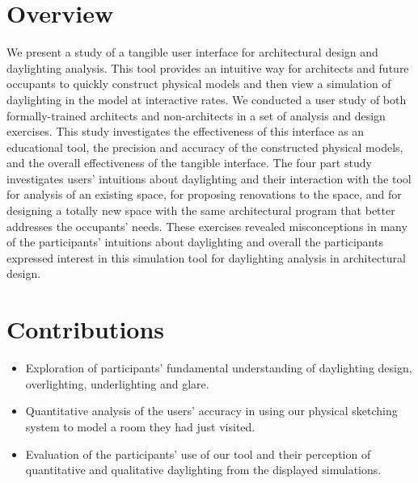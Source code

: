 \documentclass[landscape,20pt]{sciposter}
\begin{document}
\begin{minipage}[t]{10.5in}
\section*{Overview}
We present a study of a tangible user interface for architectural
design and daylighting analysis.  This tool provides an intuitive way
for architects and future occupants to quickly construct physical
models and then view a simulation of daylighting in the model at
interactive rates.
%
%
We conducted a user study of both formally-trained architects and
non-architects in a set of analysis and design exercises.
%
This study investigates the effectiveness of this interface as an
educational tool, the precision and accuracy of the constructed
physical models, and the overall effectiveness of the tangible
interface.  The four part study investigates users' intuitions about
daylighting and their interaction with the tool for analysis of an
existing space, for proposing renovations to the space, and for
designing a totally new space with the same architectural program that
better addresses the occupants' needs.  These exercises revealed
misconceptions in many of the participants' intuitions about
daylighting and overall the participants expressed interest in this
simulation tool for daylighting analysis in architectural design.
%
%
\vspace{.3in}
\section*{Contributions}
\begin{itemize}


\item Exploration of participants' fundamental understanding of
  daylighting design, overlighting, underlighting and glare.\vspace{-0.1in}

\item Quantitative analysis of the users' accuracy in using our
  physical sketching system to model a room they had just visited.\vspace{-0.1in}

\item Evaluation of the participants' use of our tool and their
  perception of quantitative and qualitative daylighting from the 
  displayed simulations.\vspace{-0.1in}


\end{itemize}
\end{minipage}
\end{document}
